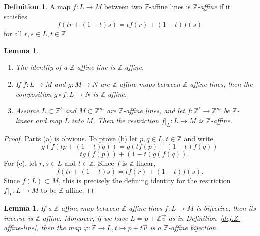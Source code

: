 \documentclass[12pt,letterpaper]{article}
\numberwithin{equation}{section}
\newcommand{\Z}{\mathbb Z}
\theoremstyle{plain}
\newtheorem{lemma}[theorem]{Lemma}
\theoremstyle{definition}
\newtheorem{definition}[theorem]{Definition}
\begin{document}

\begin{definition}
A map $f:L\to M$ between two $\Z$-affine lines is $\Z$-\emph{affine} if it satisfies 
\[
 f(tr+(1-t)s)=tf(r)+(1-t)f(s)
\] 
for all $r,s\in L, t\in\Z$. 
\end{definition}

\begin{lemma}\label{lem:cat}
\begin{enumerate}
  \item[\emph{(a)}] The identity of a $\Z$-affine line is $\Z$-affine.
  \item[\emph{(b)}] If $f:L\to M$ and $g:M\to N$ are $\Z$-affine maps between $\Z$-affine lines, then the composition $g\circ f:L\to N$ is $\Z$-affine.
  \item[\emph{(c)}] Assume $L\subset\Z^\ell$ and $M\subset\Z^m$ are $\Z$-affine lines, and let $f:\Z^\ell\to\Z^m$ be $\Z$-linear and map $L$ into $M$. Then the restriction $f|_L:L\to M$ is $\Z$-affine.
\end{enumerate}
\end{lemma}

\begin{proof}
Parts (a) is obvious. To prove (b) let $p,q\in L,t\in\Z$ and write 
\[
 g(f(tp+(1-t)q))=g(tf(p)+(1-t)f(q))
\]
\[
 =tg(f(p))+(1-t)g(f(q)).
\]
For (c), let $r,s\in L$ and $t\in\Z$. Since $f$ is $\Z$-linear,
\[
 f(tr+(1-t)s)=tf(r)+(1-t)f(s).
\]
Since $f(L)\subset M$, this is precisely the defining identity for the restriction $f|_L:L\to M$ to be $\Z$-affine.
\end{proof}

\begin{lemma}\label{lem:parametrization}
If a $\Z$-affine map between $\Z$-affine lines $f:L\to M$ is bijective, then its inverse is $\Z$-affine. Moreover, if we have $L=p+\Z\vec{v}$ as in Definition~\ref{def:Z-affine-line}, then the map $\varphi:\Z\to L, t\mapsto p+t\vec{v}$ is a $\Z$-affine bijection. 
\end{lemma}
\end{document}
